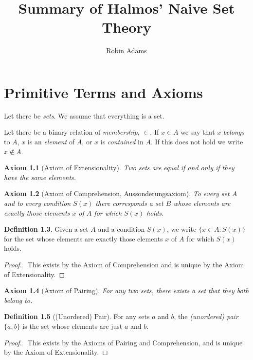 \documentclass{report}
\title{Summary of Halmos' Naive Set Theory}
\author{Robin Adams}
\let\qed\relax
\newtheorem{ax}{Axiom}[chapter]
\theoremstyle{definition}
\newtheorem{df}[ax]{Definition}
\begin{document}
\maketitle
\tableofcontents

\chapter{Primitive Terms and Axioms}

Let there be \emph{sets}. We assume that everything is a set.

Let there be a binary relation of \emph{membership}, $\in$. If $x \in A$ we say that $x$ \emph{belongs} to $A$, $x$ is an \emph{element} of $A$, or $x$ is \emph{contained} in $A$. If this does not hold we write $x \notin A$.

\begin{ax}[Axiom of Extensionality]
Two sets are equal if and only if they have the same elements.
\end{ax}

\begin{ax}[Axiom of Comprehension, Aussonderungsaxiom]
To every set $A$ and to every condition $S(x)$ there corresponds a set $B$ whose elements are exactly those elements $x$ of $A$ for which $S(x)$ holds.
\end{ax}

\begin{df}
Given a set $A$ and a condition $S(x)$, we write $\{ x \in A : S(x) \}$ for the set whose elements are exactly those elements $x$ of $A$ for which $S(x)$ holds.
\end{df}

\begin{proof}
\pf\ This exists by the Axiom of Comprehension and is unique by the Axiom of Extensionality. \qed
\end{proof}

\begin{ax}[Axiom of Pairing]
For any two sets, there exists a set that they both belong to.
\end{ax}

\begin{df}[(Unordered) Pair]
For any sets $a$ and $b$, the \emph{(unordered) pair} $\{a,b\}$ is the set whose elements are just $a$ and $b$.
\end{df}

\begin{proof}
\pf\ This exists by the Axioms of Pairing and Comprehension, and is unique by the Axiom of Extensionality. \qed
\end{proof}
\end{document}
